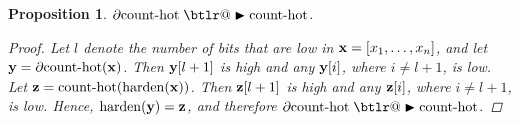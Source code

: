 \documentclass{article}
\makeatletter
\theoremstyle{plain}
\newtheorem{proposition}[theorem]{Proposition}
\theoremstyle{definition}
\theoremstyle{remark}
\DeclareRobustCommand{\btright}{\mathrel{\mathpalette\btlr@\blacktriangleright}}
\newcommand{\btlr@}[2]{%
	\begingroup
	\sbox\z@{$\m@th#1\triangleright$}%
	\sbox\tw@{\resizebox{1.1\wd\z@}{1.1\ht\z@}{\raisebox{\depth}{$\m@th#1\mkern-1mu#2$}}}%
	\ht\tw@=\ht\z@ \dp\tw@=\dp\z@ \wd\tw@=\wd\z@
	\copy\tw@
	\endgroup
}
\makeatother
\begin{document}
\begin{proposition}\label{prop:count}
	$\partial\!\operatorname{count-hot} \btright \operatorname{count-hot}$.
	\begin{proof}
		Let $l$ denote the number of bits that are low in ${\bf x} = [x_{1},\dots,x_{n}]$, and let ${\bf y} = \partial\!\operatorname{count-hot}({\bf x})$. Then ${\bf y}[l+1]$ is high and any ${\bf y}[i]$, where $i \neq l+1$, is low. Let ${\bf z} = \operatorname{count-hot}(\operatorname{harden}({\bf x}))$. Then ${\bf z}[l+1]$ is high and any ${\bf z}[i]$, where $i \neq l+1$, is low. Hence, $\operatorname{harden}({\bf y}) = {\bf z}$, and therefore $\partial\!\operatorname{count-hot} \btright \operatorname{count-hot}$.
	\end{proof}
\end{proposition}
\end{document}
